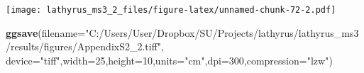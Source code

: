 \documentclass[
]{article}
\newenvironment{Shaded}{\begin{snugshade}}{\end{snugshade}}
\newcommand{\DataTypeTok}[1]{\textcolor[rgb]{0.13,0.29,0.53}{#1}}
\newcommand{\DecValTok}[1]{\textcolor[rgb]{0.00,0.00,0.81}{#1}}
\newcommand{\KeywordTok}[1]{\textcolor[rgb]{0.13,0.29,0.53}{\textbf{#1}}}
\newcommand{\NormalTok}[1]{#1}
\newcommand{\OperatorTok}[1]{\textcolor[rgb]{0.81,0.36,0.00}{\textbf{#1}}}
\newcommand{\StringTok}[1]{\textcolor[rgb]{0.31,0.60,0.02}{#1}}
\begin{document}
\begin{Shaded}
\end{Shaded}

\texttt{[image: lathyrus\_ms3\_2\_files/figure-latex/unnamed-chunk-72-2.pdf]}

\begin{Shaded}
\begin{Highlighting}[]
\KeywordTok{ggsave}\NormalTok{(}\DataTypeTok{filename=}\StringTok{"C:/Users/User/Dropbox/SU/Projects/lathyrus/lathyrus_ms3/results/figures/AppendixS2_2.tiff"}\NormalTok{,}
       \DataTypeTok{device=}\StringTok{"tiff"}\NormalTok{,}\DataTypeTok{width=}\DecValTok{25}\NormalTok{,}\DataTypeTok{height=}\DecValTok{10}\NormalTok{,}\DataTypeTok{units=}\StringTok{"cm"}\NormalTok{,}\DataTypeTok{dpi=}\DecValTok{300}\NormalTok{,}\DataTypeTok{compression=}\StringTok{"lzw"}\NormalTok{)}
\end{Highlighting}
\end{Shaded}
\end{document}
